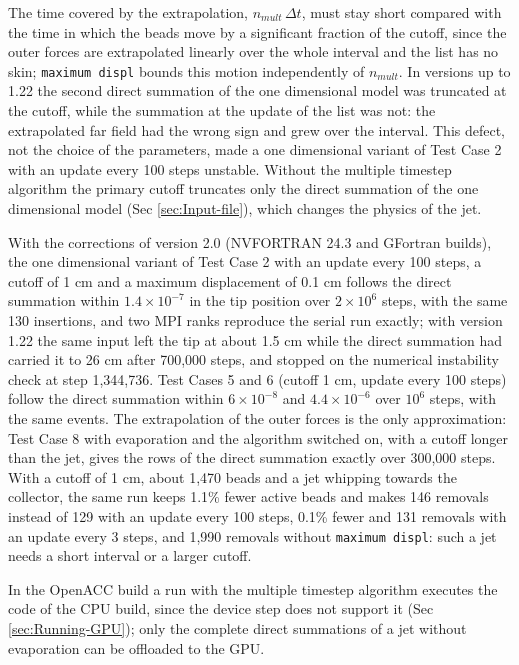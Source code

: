 The time covered by the extrapolation, $n_{mult}\,\Delta t$, must stay
short compared with the time in which the beads move by a significant
fraction of the cutoff, since the outer forces are extrapolated linearly
over the whole interval and the list has no skin; \texttt{maximum displ}
bounds this motion independently of $n_{mult}$. In versions up to 1.22
the second direct summation of the one dimensional model was truncated
at the cutoff, while the summation at the update of the list was not:
the extrapolated far field had the wrong sign and grew over the interval.
This defect, not the choice of the parameters, made a one dimensional
variant of Test Case 2 with an update every 100 steps unstable. Without
the multiple timestep algorithm the primary cutoff truncates only the
direct summation of the one dimensional model (Sec \ref{sec:Input-file}),
which changes the physics of the jet.

With the corrections of version 2.0 (NVFORTRAN 24.3 and GFortran builds),
the one dimensional variant of Test Case 2 with an update every 100 steps,
a cutoff of 1 cm and a maximum displacement of 0.1 cm follows the direct
summation within $1.4\times10^{-7}$ in the tip position over $2\times10^{6}$
steps, with the same 130 insertions, and two MPI ranks reproduce the serial
run exactly; with version 1.22 the same input left the tip at about 1.5 cm
while the direct summation had carried it to 26 cm after 700,000 steps,
and stopped on the numerical instability check at step 1,344,736. Test
Cases 5 and 6 (cutoff 1 cm, update every 100 steps) follow the direct
summation within $6\times10^{-8}$ and $4.4\times10^{-6}$ over $10^{6}$
steps, with the same events. The extrapolation of the outer forces is the
only approximation: Test Case 8 with evaporation and the algorithm switched
on, with a cutoff longer than the jet, gives the rows of the direct
summation exactly over 300,000 steps. With a cutoff of 1 cm, about 1,470
beads and a jet whipping towards the collector, the same run keeps 1.1\%
fewer active beads and makes 146 removals instead of 129 with an update
every 100 steps, 0.1\% fewer and 131 removals with an update every 3 steps,
and 1,990 removals without \texttt{maximum displ}: such a jet needs a short
interval or a larger cutoff.

In the OpenACC build a run with the multiple timestep algorithm executes
the code of the CPU build, since the device step does not support it
(Sec \ref{sec:Running-GPU}); only the complete direct summations of
a jet without evaporation can be offloaded to the GPU.
